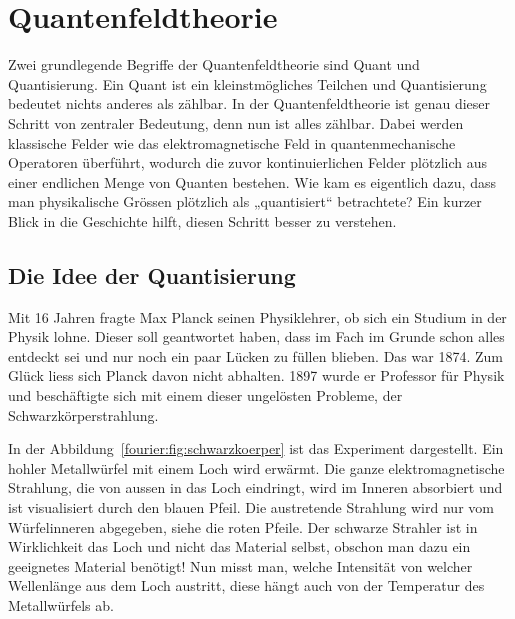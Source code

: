 %
%
%
%
\section{Quantenfeldtheorie\label{fourier:section:quantenfeldtheorie}}
Zwei grundlegende Begriffe der Quantenfeldtheorie sind Quant und Quantisierung. 
%
Ein Quant ist ein kleinstmögliches Teilchen und Quantisierung bedeutet nichts anderes als zählbar. 
In der Quantenfeldtheorie ist genau dieser Schritt von zentraler Bedeutung, denn nun ist alles zählbar. 
Dabei werden klassische Felder wie das elektromagnetische Feld in quantenmechanische Operatoren überführt, wodurch die zuvor kontinuierlichen Felder plötzlich aus einer endlichen Menge von Quanten bestehen.
Wie kam es eigentlich dazu, dass man physikalische Grössen plötzlich als „quantisiert“ betrachtete?
Ein kurzer Blick in die Geschichte hilft, diesen Schritt besser zu verstehen.

\subsection{Die Idee der Quantisierung\label{fourier:subsection:DieIdeeDerQuantisierung}}
Mit 16 Jahren fragte Max Planck seinen Physiklehrer, ob sich ein Studium in der Physik lohne. 
%
Dieser soll geantwortet haben, dass im Fach im Grunde schon alles entdeckt sei und nur noch ein paar Lücken zu füllen blieben.
Das war 1874.
Zum Glück liess sich Planck davon nicht abhalten.
1897 wurde er Professor für Physik und beschäftigte sich mit einem dieser ungelösten Probleme, der Schwarzkörperstrahlung. 
%

In der Abbildung~\ref{fourier:fig:schwarzkoerper} ist das Experiment dargestellt. Ein hohler Metallwürfel mit einem Loch wird erwärmt. 
Die ganze elektromagnetische Strahlung, die von aussen in das Loch eindringt, wird im Inneren absorbiert und ist visualisiert durch den blauen Pfeil. 
Die austretende Strahlung wird nur vom Würfelinneren abgegeben, siehe die roten Pfeile. 
Der schwarze Strahler ist in Wirklichkeit das Loch und nicht das Material selbst, obschon man dazu ein geeignetes Material benötigt!
Nun misst man, welche Intensität von welcher Wellenlänge aus dem Loch austritt, diese hängt auch von der Temperatur des Metallwürfels ab. 
%

